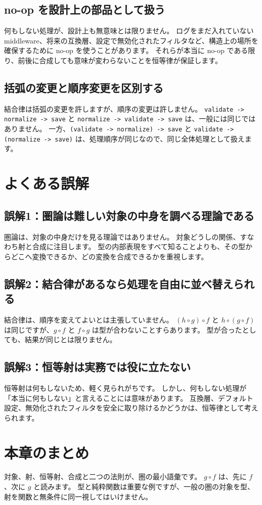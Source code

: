 \subsection{no-op を設計上の部品として扱う}

何もしない処理が、設計上も無意味とは限りません。
ログをまだ入れていない middleware、将来の互換層、設定で無効化されたフィルタなど、構造上の場所を確保するために no-op を使うことがあります。
それらが本当に no-op である限り、前後に合成しても意味が変わらないことを恒等律が保証します。

\subsection{括弧の変更と順序変更を区別する}

結合律は括弧の変更を許しますが、順序の変更は許しません。
\texttt{validate -> normalize -> save} と \texttt{normalize -> validate -> save} は、一般には同じではありません。
一方、\texttt{(validate -> normalize) -> save} と \texttt{validate -> (normalize -> save)} は、処理順序が同じなので、同じ全体処理として扱えます。

\section{よくある誤解}

\subsection{誤解1：圏論は難しい対象の中身を調べる理論である}

圏論は、対象の中身だけを見る理論ではありません。
対象どうしの関係、すなわち射と合成に注目します。
型の内部表現をすべて知ることよりも、その型からどこへ変換できるか、どの変換を合成できるかを重視します。

\subsection{誤解2：結合律があるなら処理を自由に並べ替えられる}

結合律は、順序を変えてよいとは主張していません。
\((h \circ g) \circ f\) と \(h \circ (g \circ f)\) は同じですが、\(g \circ f\) と \(f \circ g\) は型が合わないことすらあります。
型が合ったとしても、結果が同じとは限りません。

\subsection{誤解3：恒等射は実務では役に立たない}

恒等射は何もしないため、軽く見られがちです。
しかし、何もしない処理が「本当に何もしない」と言えることには意味があります。
互換層、デフォルト設定、無効化されたフィルタを安全に取り除けるかどうかは、恒等律として考えられます。

\section{本章のまとめ}

対象、射、恒等射、合成と二つの法則が、圏の最小語彙です。
\(g \circ f\) は、先に \(f\)、次に \(g\) と読みます。
型と純粋関数は重要な例ですが、一般の圏の対象を型、射を関数と無条件に同一視してはいけません。
